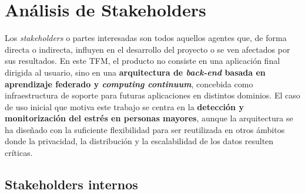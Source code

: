 \documentclass{report}
\begin{document}
 


\chapter{Análisis de Stakeholders}
\label{chap:stakeholders}

Los \textit{stakeholders} o partes interesadas son todos aquellos agentes que, de forma directa o indirecta, influyen en el desarrollo del proyecto o se ven afectados por sus resultados.  
En este TFM, el producto no consiste en una aplicación final dirigida al usuario, sino en una \textbf{arquitectura de \textit{back-end} basada en aprendizaje federado y \textit{computing continuum}}, concebida como infraestructura de soporte para futuras aplicaciones en distintos dominios.  
El caso de uso inicial que motiva este trabajo se centra en la \textbf{detección y monitorización del estrés en personas mayores}, aunque la arquitectura se ha diseñado con la suficiente flexibilidad para ser reutilizada en otros ámbitos donde la privacidad, la distribución y la escalabilidad de los datos resulten críticas.

\section*{Stakeholders internos}
\end{document}
